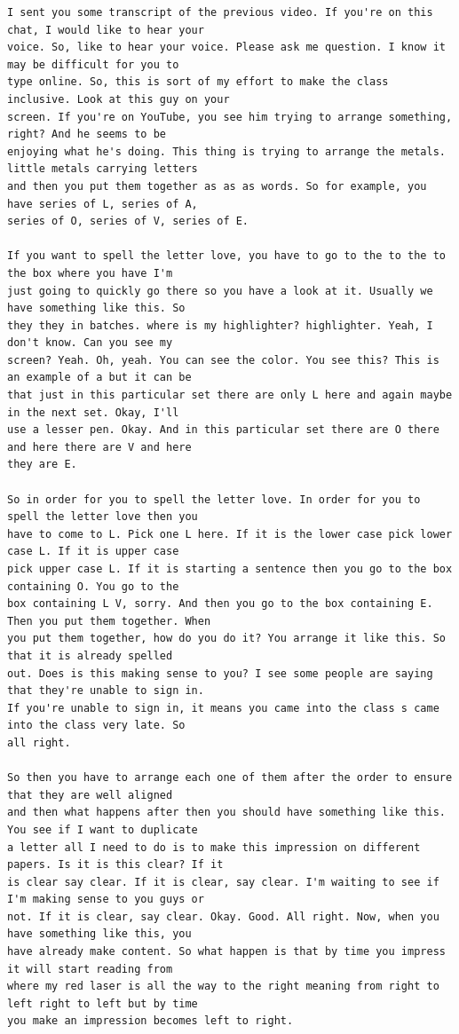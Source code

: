 {\begin{Verbatim}
I sent you some transcript of the previous video. If you're on this chat, I would like to hear your
voice. So, like to hear your voice. Please ask me question. I know it may be difficult for you to
type online. So, this is sort of my effort to make the class inclusive. Look at this guy on your
screen. If you're on YouTube, you see him trying to arrange something, right? And he seems to be
enjoying what he's doing. This thing is trying to arrange the metals. little metals carrying letters
and then you put them together as as as words. So for example, you have series of L, series of A,
series of O, series of V, series of E.

If you want to spell the letter love, you have to go to the to the to the box where you have I'm
just going to quickly go there so you have a look at it. Usually we have something like this. So
they they in batches. where is my highlighter? highlighter. Yeah, I don't know. Can you see my
screen? Yeah. Oh, yeah. You can see the color. You see this? This is an example of a but it can be
that just in this particular set there are only L here and again maybe in the next set. Okay, I'll
use a lesser pen. Okay. And in this particular set there are O there and here there are V and here
they are E.

So in order for you to spell the letter love. In order for you to spell the letter love then you
have to come to L. Pick one L here. If it is the lower case pick lower case L. If it is upper case
pick upper case L. If it is starting a sentence then you go to the box containing O. You go to the
box containing L V, sorry. And then you go to the box containing E. Then you put them together. When
you put them together, how do you do it? You arrange it like this. So that it is already spelled
out. Does is this making sense to you? I see some people are saying that they're unable to sign in.
If you're unable to sign in, it means you came into the class s came into the class very late. So
all right.

So then you have to arrange each one of them after the order to ensure that they are well aligned
and then what happens after then you should have something like this. You see if I want to duplicate
a letter all I need to do is to make this impression on different papers. Is it is this clear? If it
is clear say clear. If it is clear, say clear. I'm waiting to see if I'm making sense to you guys or
not. If it is clear, say clear. Okay. Good. All right. Now, when you have something like this, you
have already make content. So what happen is that by time you impress it will start reading from
where my red laser is all the way to the right meaning from right to left right to left but by time
you make an impression becomes left to right.


\end{Verbatim}}

